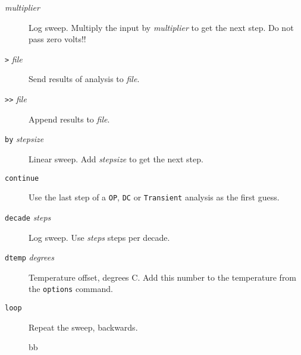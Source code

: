 \begin{description}

\item[{\tt *} {\it multiplier}]
Log sweep.  Multiply the input by {\it multiplier} to get the next
step.  Do not pass zero volts!!

\item[{\tt >} {\it file}]
Send results of analysis to {\it file}.

\item[{\tt >>} {\it file}]
Append results to {\it file}.



\item[{\tt by} {\it stepsize}]
Linear sweep.  Add {\it stepsize} to get the next step.

\item[{\tt continue}]
Use the last step of a {\tt OP}, {\tt DC} or {\tt Transient} analysis
as the first guess.



\item[{\tt decade} {\it steps}]
Log sweep.  Use {\it steps} steps per decade.

\item[{\tt dtemp} {\it degrees}]
Temperature offset, degrees C.  Add this number to the temperature
from the {\tt options} command.



\item[{\tt loop}]
Repeat the sweep, backwards.

bb%


\end{description}
